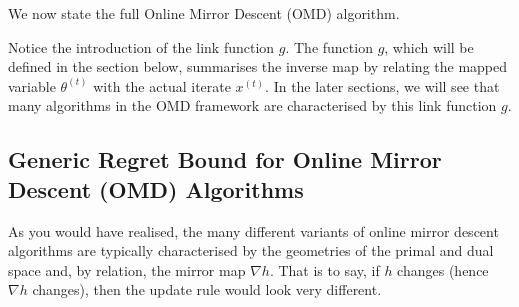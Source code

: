 \noindent We now state the full Online Mirror Descent (OMD) algorithm.
\begin{center}
\end{center}
Notice the introduction of the link function $g$. The function $g$, which will be defined in the section below, summarises the inverse map by relating the mapped variable $\theta^{(t)}$ with the actual iterate $x^{(t)}$. In the later sections, we will see that many algorithms in the OMD framework are characterised by this link function $g$.

\subsection{Generic Regret Bound for Online Mirror Descent (OMD) Algorithms}
As you would have realised, the many different variants of online mirror descent algorithms are typically characterised by the geometries of the primal and dual space and, by relation, the mirror map $\nabla h$. That is to say, if $h$ changes (hence $\nabla h$ changes), then the update rule would look very different. 

